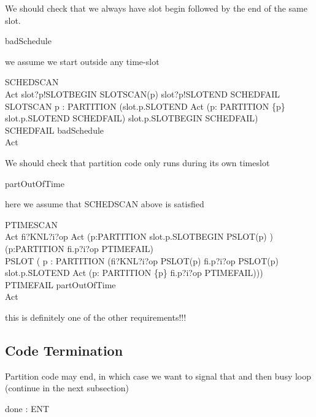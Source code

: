 We should check that we always have slot begin followed by the end of the
same slot.
\begin{circus}

\circchannel badSchedule
\end{circus}
we assume we start outside any time-slot
\begin{circus}
\circprocess SCHEDSCAN \circdef \circbegin\\
  Act \circdef slot?p!SLOTBEGIN \then  SLOTSCAN(p)
              \extchoice  slot?p!SLOTEND   \then  SCHEDFAIL\\
  SLOTSCAN \circdef \circvar p : PARTITION \circspot
        (slot.p.SLOTEND   \then  Act
        \extchoice  (\Extchoice  p: PARTITION \cap \{p\} \circspot slot.p.SLOTEND \then  SCHEDFAIL)
        \extchoice  slot.p.SLOTBEGIN \then  SCHEDFAIL)\\
  SCHEDFAIL \circdef badSchedule \then \Stop\\
\circspot Act\\
\circend
\end{circus}
We should check that partition code only runs during its own timeslot
\begin{circus}

\circchannel partOutOfTime
\end{circus}
here we assume that SCHEDSCAN above is satisfied
\begin{circus}
\circprocess PTIMESCAN \circdef \circbegin\\
  Act \circdef fi?KNL?i?op  \then  Act
            \extchoice  (\Extchoice  p:PARTITION \circspot slot.p.SLOTBEGIN \then  PSLOT(p) )
            \extchoice  (\Extchoice  p:PARTITION \circspot fi.p?i?op        \then  PTIMEFAIL)\\
PSLOT  \circdef( \circvar p : PARTITION \circspot (fi?KNL?i?op    \then  PSLOT(p)
            \extchoice  fi.p?i?op      \then  PSLOT(p)
            \extchoice  slot.p.SLOTEND \then  Act
            \extchoice  (\Extchoice  p: PARTITION \cap \{p\} \circspot fi.p?i?op \then  PTIMEFAIL)))\\
PTIMEFAIL \circdef partOutOfTime \then  \Stop\\
\circspot Act\\
\circend
\end{circus}
this is definitely one of the other requirements!!!

\subsection{Code Termination} %
Partition code may end,
in which case we want to signal that and then busy loop (continue in the next subsection)
\begin{circus}
\circchannel done : ENT
\end{circus}


